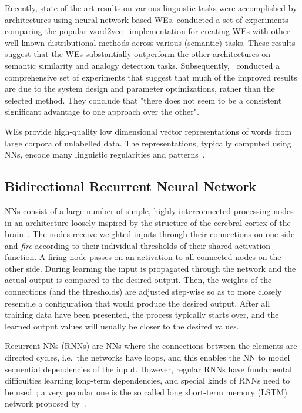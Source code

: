 \documentclass[11pt,a4paper]{article}
\begin{document}
Recently, state-of-the-art results on various linguistic tasks were accomplished by architectures using neural-network based WEs.
 conducted a set of experiments comparing the popular word2vec~\cite{DBLP:journals/corr/abs-1301-3781,arXiv:1310.4546} implementation for creating WEs with other well-known distributional methods across various (semantic) tasks.
These results suggest that the WEs substantially outperform the other architectures on semantic similarity and analogy detection tasks.
Subsequently,~ conducted a comprehensive set of experiments that suggest that much of the improved results are due to the system design and parameter optimizations, rather than the selected method. 
They conclude that "there does not seem to be a consistent significant advantage to one approach over the other".

WEs provide high-quality low dimensional vector representations of words from large corpora of unlabelled data. The representations, typically computed using NNs, encode many linguistic regularities and patterns~\cite{arXiv:1310.4546}.


\subsection{Bidirectional Recurrent Neural Network}  %
\label{subsec:nn}

NNs consist of a large number of simple, highly interconnected processing nodes in an architecture loosely inspired by the structure of the cerebral cortex of the brain~\cite{oreilly2000}.
The nodes receive weighted inputs through their connections on one side and \emph{fire} according to their individual thresholds of their shared activation function.
A firing node passes on an activation to all connected nodes on the other side.
During learning the input is propagated through the network and the actual output is compared to the desired output. 
Then, the weights of the connections (and the thresholds) are adjusted step-wise so as to more closely resemble a configuration that would produce the desired output.
After all training data have been presented, the process typically starts over, and the learned output values will usually be closer to the desired values.

Recurrent NNs (RNNs)  are NNs where the connections between the elements are directed cycles, i.e.~the networks have loops, and this enables the NN to model sequential dependencies of the input.
However, regular RNNs have fundamental difficulties learning long-term dependencies, and special kinds of RNNs need to be used~\cite{Hochreiter1991}; 
a very popular one is the so called long short-term memory (LSTM) network proposed by~.
\end{document}

